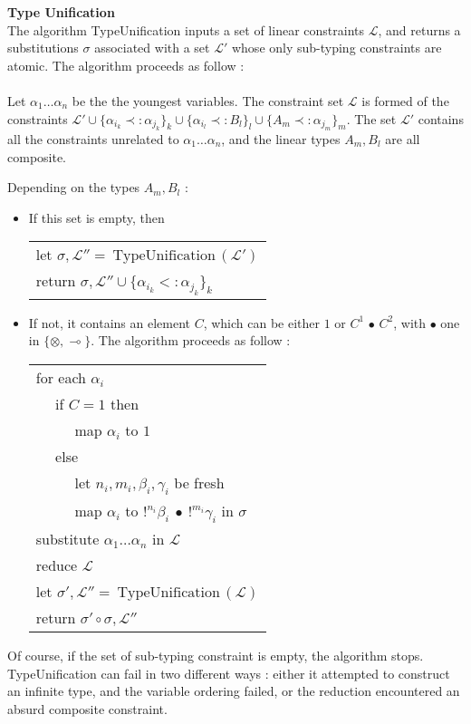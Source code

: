 \begin{defn}{\bf Type Unification} \\
	The algorithm TypeUnification inputs a set of linear constraints $\mathcal{L}$, and returns
	a substitutions $\sigma$ associated with a set $\mathcal{L'}$ whose only sub-typing constraints are atomic.
	The algorithm proceeds as follow : \\
	\\
  Let $\alpha_1 \dots \alpha_n$ be the the youngest variables. The constraint set $\mathcal{L}$ is formed of the constraints
  $\mathcal{L'} \cup \{ \alpha_{i_k} \prec: \alpha_{j_k} \}_k \cup \{ \alpha_{i_l} \prec: B_l \}_l
	\cup \{ A_m \prec: \alpha_{j_m} \}_m$.
  The set $\mathcal{L'}$ contains all the constraints unrelated to $\alpha_1 \dots \alpha_n$,
  and the linear types $A_m, B_l$ are all composite.
  		
  Depending on the types $A_m, B_l$ :
	\begin{itemize}
		\item If this set is empty, then \\
			\begin{tabular}{l}
				let $\sigma, \mathcal{L''} = ~\text{TypeUnification}\,(\mathcal{L'})$ \\
				return $\sigma, \mathcal{L''} \cup \{ \alpha_{i_k} <: \alpha_{j_k} \}_k$
			\end{tabular}
	  
	  \item If not, it contains an element $C$, which can be either $1$ or $C^1 \,\bullet \, C^2$, with $\bullet$ one in $\{ \otimes, \multimap \}$.
		  The algorithm proceeds as follow :\\
	  	\begin{tabular}{l}
	  		for each $\alpha_i$ \\
	  		~~ if $C = 1$ then \\
	  		~~ ~~ map $\alpha_i$ to $1$ \\
	  		~~ else \\
	  		~~ ~~ let $n_i, m_i, \beta_i, \gamma_i$ be fresh \\
	  		~~ ~~ map $\alpha_i$ to $!^{n_i} \beta_i ~\bullet~ !^{m_i}\gamma_i$ in $\sigma$ \\
	  		substitute $\alpha_1 \dots \alpha_n$ in $\mathcal{L}$ \\
	  		reduce $\mathcal{L}$ \\
	  		let $\sigma', \mathcal{L''} = ~\text{TypeUnification}\,(\mathcal{L})$ \\
	  		return $\sigma' \circ \sigma, \mathcal{L''}$
	  	\end{tabular}
  \end{itemize}

  Of course, if the set of sub-typing constraint is empty, the algorithm stops.
  TypeUnification can fail in two different ways : either it attempted to construct an infinite
  type, and the variable ordering failed, or the reduction encountered an absurd composite constraint.
\end{defn}

